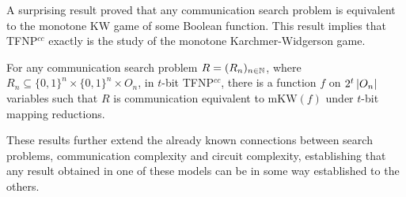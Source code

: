 A surprising result \cite{span_programs, adventures_monotone_tfnp} proved that any communication search problem is equivalent to the monotone KW game of some Boolean function. This result implies that \textsf{TFNP}$^{cc}$ exactly is the study of the monotone Karchmer-Widgerson game.

\begin{lemma}
 For any communication search problem $R = (R_n)_{n \in \mathbb{N}}$, where $R_n \subseteq \{0,1\}^n \times \{0,1\}^n \times O_n$, in $t$-bit \textsf{TFNP}$^{cc}$, there is a function $f$ on $2^t\left|O_n\right|$ variables such that $R$ is communication equivalent to $\mathrm{mKW}(f)$ under $t$-bit mapping reductions.
\end{lemma}

These results further extend the already known connections between search problems, communication complexity and circuit complexity, establishing that any result obtained in one of these models can be in some way established to the others.

\cleardoublepage
